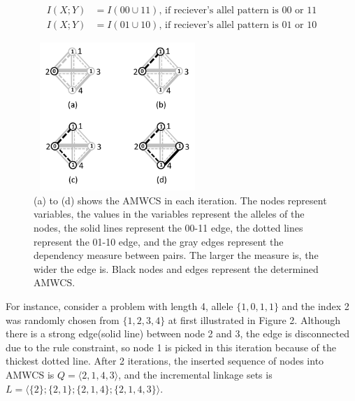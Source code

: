 \documentclass{sig-alternate-05-2015}
\begin{document}
\begin{displaymath} 
\begin{split}
I(X;Y) &= I(00\cup11) \text{, if reciever's allel pattern is 00 or 11} \\
I(X;Y) &= I(01\cup10) \text{, if reciever's allel pattern is 01 or 10} 
\end{split}
\end{displaymath}

\begin{figure}
\centering
\includegraphics[height=2.2in, width=2.5in]{AMWCS2edge}
\caption{(a) to (d) shows the AMWCS in each iteration. The nodes represent variables, the values in the variables represent the alleles of the nodes, the solid lines represent the 00-11 edge, the dotted lines represent the 01-10 edge, and the gray edges represent the dependency measure between pairs. The larger the measure is, the wider the edge is. Black nodes and edges represent the determined AMWCS.}
\end{figure}


For instance, consider a problem with length 4, allele $\{1, 0, 1, 1\}$ and the index 2 was randomly chosen from $ \{1, 2, 3, 4\}$ at first illustrated in Figure 2. Although there is a strong edge(solid line) between node 2 and 3, the edge is disconnected due to the rule constraint, so node 1 is picked in this iteration because of the thickest dotted line. After 2 iterations, the inserted sequence of nodes into AMWCS is $Q = ⟨2, 1, 4, 3⟩$, and the incremental linkage sets is $L = \langle\{2\}; \{2, 1\};\{2, 1, 4\}; \{ 2, 1,  4,  3\}\rangle$.
\end{document}
